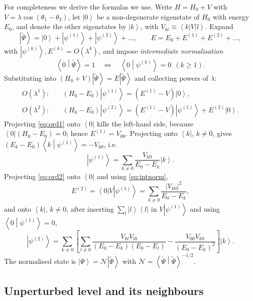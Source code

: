 \documentclass[preprint,12pt]{elsarticle}
\newcommand{\ket}[1]{\left|#1\right\rangle}
\newcommand{\bra}[1]{\left\langle#1\right|}
\newcommand{\braket}[2]{\left\langle#1\middle|#2\right\rangle}
\newcommand{\Norm}{\mathcal{N}}
\begin{document}
For completeness we derive the formulas we use. Write $H=H_{0}+V$ with
$V=\lambda\cos(\theta_{1}-\theta_{2})$, let $\ket{0}$ be a non-degenerate
eigenstate of $H_{0}$ with energy $E_{0}$, and denote the other eigenstates by
$\ket{k}$, with $V_{kl}\equiv\bra{k}V\ket{l}$. Expand
\begin{equation}
\ket{\widetilde\Psi}=\ket{0}+\ket{\psi^{(1)}}+\ket{\psi^{(2)}}+\dots,\qquad
E=E_{0}+E^{(1)}+E^{(2)}+\dots,
\end{equation}
with $\ket{\psi^{(k)}},E^{(k)}=O(\lambda^{k})$, and impose \emph{intermediate
normalisation}
\begin{equation}
\braket{0}{\widetilde\Psi}=1\quad\Longleftrightarrow\quad
\braket{0}{\psi^{(k)}}=0\ \ (k\ge1).
\label{eq:intnorm}
\end{equation}
Substituting into $(H_{0}+V)\ket{\widetilde\Psi}=E\ket{\widetilde\Psi}$ and
collecting powers of $\lambda$:
\begin{align}
O(\lambda^{1}):&\quad (H_{0}-E_{0})\ket{\psi^{(1)}}=\left(E^{(1)}-V\right)\ket{0},
\label{eq:ord1}\\
O(\lambda^{2}):&\quad (H_{0}-E_{0})\ket{\psi^{(2)}}=\left(E^{(1)}-V\right)
\ket{\psi^{(1)}}+E^{(2)}\ket{0}.
\label{eq:ord2}
\end{align}
Projecting \eqref{eq:ord1} onto $\bra{0}$ kills the left-hand side, because
$\bra{0}(H_{0}-E_{0})=0$; hence $E^{(1)}=V_{00}$. Projecting onto $\bra{k}$,
$k\neq0$, gives $(E_{k}-E_{0})\braket{k}{\psi^{(1)}}=-V_{k0}$, i.e.
\begin{equation}
\ket{\psi^{(1)}}=\sum_{k\neq0}\frac{V_{k0}}{E_{0}-E_{k}}\ket{k}.
\label{eq:psi1gen}
\end{equation}
Projecting \eqref{eq:ord2} onto $\bra{0}$ and using \eqref{eq:intnorm},
\begin{equation}
E^{(2)}=\bra{0}V\ket{\psi^{(1)}}=\sum_{k\neq0}\frac{|V_{k0}|^{2}}{E_{0}-E_{k}},
\label{eq:E2gen}
\end{equation}
and onto $\bra{k}$, $k\neq0$, after inserting $\sum_{l}\ket{l}\bra{l}$ in
$V\ket{\psi^{(1)}}$ and using $\braket{0}{\psi^{(1)}}=0$,
\begin{equation}
\ket{\psi^{(2)}}=\sum_{k\neq0}\left[\sum_{l\neq0}
\frac{V_{kl}V_{l0}}{(E_{0}-E_{k})(E_{0}-E_{l})}
-\frac{V_{00}V_{k0}}{(E_{0}-E_{k})^{2}}\right]\ket{k}.
\label{eq:psi2gen}
\end{equation}
The normalised state is $\ket{\Psi}=\Norm\ket{\widetilde\Psi}$ with
$\Norm=\braket{\widetilde\Psi}{\widetilde\Psi}^{-1/2}$.

\subsection{Unperturbed level and its neighbours}
\end{document}
